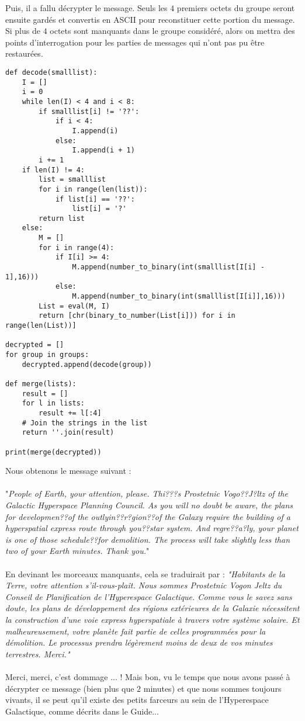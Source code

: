 \documentclass{article}
\begin{document}
Puis, il a fallu décrypter le message. Seuls les $4$ premiers octets du groupe seront ensuite gardés et convertis en ASCII pour reconstituer cette portion du message.\\
Si plus de $4$ octets sont manquants dans le groupe considéré, alors on mettra des points d'interrogation pour les parties de messages qui n'ont pas pu être restaurées.

\begin{lstlisting}
def decode(smalllist):
    I = []
    i = 0
    while len(I) < 4 and i < 8:
        if smalllist[i] != '??':
            if i < 4:
                I.append(i)
            else:
                I.append(i + 1)
        i += 1
    if len(I) != 4:
        list = smalllist
        for i in range(len(list)):
            if list[i] == '??':
                list[i] = '?'
        return list
    else:
        M = []
        for i in range(4):
            if I[i] >= 4:
                M.append(number_to_binary(int(smalllist[I[i] - 1],16)))
            else:
                M.append(number_to_binary(int(smalllist[I[i]],16)))
        List = eval(M, I)
        return [chr(binary_to_number(List[i])) for i in range(len(List))]
    
decrypted = []
for group in groups:
    decrypted.append(decode(group))

def merge(lists):
    result = []
    for l in lists:
        result += l[:4]
    # Join the strings in the list
    return ''.join(result)

print(merge(decrypted))
\end{lstlisting}

Nous obtenons le message suivant :\\ \\
"\textit{People of Earth, your attention, please. Thi???s Prostetnic Vogo??J?ltz of the Galactic Hyperspace Planning Council. As you will no doubt be aware, the plans for developmen??of the outlyin??r?gion??of the Galaxy require the building of a hyperspatial express route through you??star system. And regre??a?ly, your planet is one of those schedule??for demolition. The process will take slightly less than two of your Earth minutes. Thank you.}"\\ \\ 
En devinant les morceaux manquants, cela se traduirait par : \textit{"Habitants de la Terre, votre attention s'il-vous-plaît. Nous sommes Prostetnic Vogon Jeltz du Conseil de Planification de l'Hyperespace Galactique. Comme vous le savez sans doute, les plans de développement des régions extérieures de la Galaxie nécessitent la construction d'une voie express hyperspatiale à travers votre système solaire. Et malheureusement, votre planète fait partie de celles programmées pour la démolition. Le processus prendra légèrement moins de deux de vos minutes terrestres. Merci."} \\ \\
Merci, merci, c'est dommage ... ! Mais bon, vu le temps que nous avons passé à décrypter ce message (bien plus que $2$ minutes) et que nous sommes toujours vivants, il se peut qu'il existe des petits farceurs au sein de l'Hyperespace Galactique, comme décrits dans le Guide...

\newpage
\nocite{*}
\printbibliography
\end{document}
